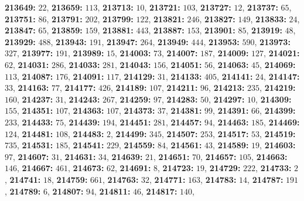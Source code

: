 \textsf{\bfseries 213649:} $22$, \textsf{\bfseries 213659:} $113$, \textsf{\bfseries 213713:} $10$, \textsf{\bfseries 213721:} $103$, \textsf{\bfseries 213727:} $12$, \textsf{\bfseries 213737:} $65$, \textsf{\bfseries 213751:} $86$, \textsf{\bfseries 213791:} $202$, \textsf{\bfseries 213799:} $122$, \textsf{\bfseries 213821:} $246$, \textsf{\bfseries 213827:} $149$, \textsf{\bfseries 213833:} $24$, \textsf{\bfseries 213847:} $65$, \textsf{\bfseries 213859:} $159$, \textsf{\bfseries 213881:} $443$, \textsf{\bfseries 213887:} $153$, \textsf{\bfseries 213901:} $85$, \textsf{\bfseries 213919:} $48$, \textsf{\bfseries 213929:} $488$, \textsf{\bfseries 213943:} $191$, \textsf{\bfseries 213947:} $264$, \textsf{\bfseries 213949:} $444$, \textsf{\bfseries 213953:} $590$, \textsf{\bfseries 213973:} $327$, \textsf{\bfseries 213977:} $191$, \textsf{\bfseries 213989:} $15$, \textsf{\bfseries 214003:} $73$, \textsf{\bfseries 214007:} $187$, \textsf{\bfseries 214009:} $127$, \textsf{\bfseries 214021:} $62$, \textsf{\bfseries 214031:} $286$, \textsf{\bfseries 214033:} $281$, \textsf{\bfseries 214043:} $156$, \textsf{\bfseries 214051:} $56$, \textsf{\bfseries 214063:} $45$, \textsf{\bfseries 214069:} $113$, \textsf{\bfseries 214087:} $176$, \textsf{\bfseries 214091:} $117$, \textsf{\bfseries 214129:} $31$, \textsf{\bfseries 214133:} $405$, \textsf{\bfseries 214141:} $24$, \textsf{\bfseries 214147:} $33$, \textsf{\bfseries 214163:} $77$, \textsf{\bfseries 214177:} $426$, \textsf{\bfseries 214189:} $107$, \textsf{\bfseries 214211:} $96$, \textsf{\bfseries 214213:} $235$, \textsf{\bfseries 214219:} $160$, \textsf{\bfseries 214237:} $31$, \textsf{\bfseries 214243:} $267$, \textsf{\bfseries 214259:} $97$, \textsf{\bfseries 214283:} $50$, \textsf{\bfseries 214297:} $10$, \textsf{\bfseries 214309:} $155$, \textsf{\bfseries 214351:} $107$, \textsf{\bfseries 214363:} $107$, \textsf{\bfseries 214373:} $37$, \textsf{\bfseries 214381:} $99$, \textsf{\bfseries 214391:} $66$, \textsf{\bfseries 214399:} $233$, \textsf{\bfseries 214433:} $75$, \textsf{\bfseries 214439:} $194$, \textsf{\bfseries 214451:} $281$, \textsf{\bfseries 214457:} $94$, \textsf{\bfseries 214463:} $185$, \textsf{\bfseries 214469:} $124$, \textsf{\bfseries 214481:} $108$, \textsf{\bfseries 214483:} $2$, \textsf{\bfseries 214499:} $345$, \textsf{\bfseries 214507:} $253$, \textsf{\bfseries 214517:} $53$, \textsf{\bfseries 214519:} $735$, \textsf{\bfseries 214531:} $185$, \textsf{\bfseries 214541:} $229$, \textsf{\bfseries 214559:} $84$, \textsf{\bfseries 214561:} $43$, \textsf{\bfseries 214589:} $19$, \textsf{\bfseries 214603:} $97$, \textsf{\bfseries 214607:} $31$, \textsf{\bfseries 214631:} $34$, \textsf{\bfseries 214639:} $21$, \textsf{\bfseries 214651:} $70$, \textsf{\bfseries 214657:} $105$, \textsf{\bfseries 214663:} $146$, \textsf{\bfseries 214667:} $461$, \textsf{\bfseries 214673:} $62$, \textsf{\bfseries 214691:} $8$, \textsf{\bfseries 214723:} $19$, \textsf{\bfseries 214729:} $222$, \textsf{\bfseries 214733:} $2$, \textsf{\bfseries 214741:} $18$, \textsf{\bfseries 214759:} $661$, \textsf{\bfseries 214763:} $32$, \textsf{\bfseries 214771:} $163$, \textsf{\bfseries 214783:} $14$, \textsf{\bfseries 214787:} $191$, \textsf{\bfseries 214789:} $6$, \textsf{\bfseries 214807:} $94$, \textsf{\bfseries 214811:} $46$, \textsf{\bfseries 214817:} $140$, 
